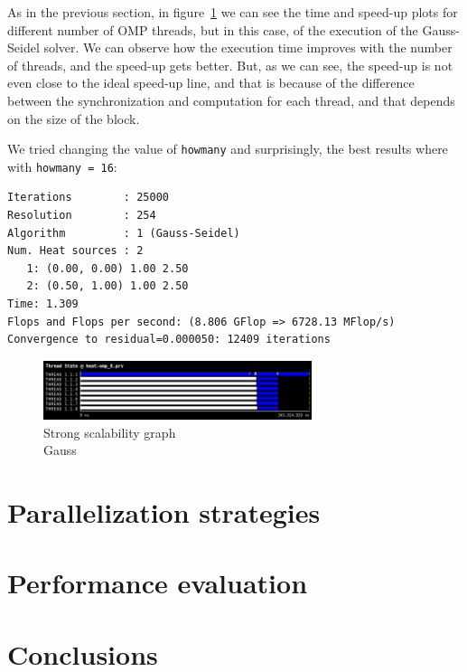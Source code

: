As in the previous section, in figure~\ref{fig:strong-gauss} we can see the time and speed-up plots for different number 
of OMP threads, but in this case, of the execution of the Gauss-Seidel solver. We can observe how the execution time improves with the number of threads, and the speed-up gets better. But, as we can see, the speed-up is not even close to the ideal speed-up line, and that is because of the difference between the synchronization and computation for each thread, and that depends on the size of the block.



We tried changing the value of \texttt{howmany} and surprisingly, the best results where with \texttt{howmany = 16}:

\begin{verbatim}
Iterations        : 25000
Resolution        : 254
Algorithm         : 1 (Gauss-Seidel)
Num. Heat sources : 2
   1: (0.00, 0.00) 1.00 2.50 
   2: (0.50, 1.00) 1.00 2.50 
Time: 1.309 
Flops and Flops per second: (8.806 GFlop => 6728.13 MFlop/s)
Convergence to residual=0.000050: 12409 iterations
\end{verbatim}

\begin{figure}[H]
    \centering
    \includegraphics[width=0.7\textwidth]{figures/thread_state_heat_omp_8}
    \caption{Strong scalability graph \\ Gauss}%
    \label{fig:strong-gauss}
\end{figure}


\section{Parallelization strategies}%
\label{sec:parallelization_strategies}



\section{Performance evaluation}%
\label{sec:performance_evaluation}

\section{Conclusions}%
\label{sec:conclusions}






